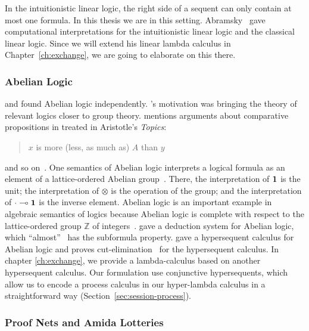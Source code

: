  In the intuitionistic linear logic, the right side of a sequent can only
 contain at most one formula.  In this thesis we are in this
 setting.
 Abramsky~\citep{abramsky1993computational} gave computational
 interpretations for the intuitionistic linear logic and the classical
 linear logic.  Since we will extend his linear lambda calculus in
 Chapter~\ref{ch:exchange}, we are going to elaborate on this there.

 \subsubsection{Abelian Logic}

 \citet{meyer-slaney-1989} and \citet{casari1989} found Abelian logic
 independently.  \citet{meyer-slaney-1989}'s motivation was bringing the
 theory of relevant logics closer to group theory.
 \citet{casari1989} mentions arguments about comparative propositions in
 treated in Aristotle's \textit{Topics}:
  \begin{quote}
   $x$ is more (less, as much as) $A$ than $y$
  \end{quote}
 and so on~\citep[p.~161]{casari1989}.
 One semantics of Abelian logic interprets a logical formula as an
 element of a lattice-ordered Abelian group~\citep[3.4.2.]{residuated}.  There,
 the interpretation of $\mathbf{1}$ is the unit;
 the interpretation of $\otimes$ is the operation of the group; and
 the interpretation of $\cdot\multimap\mathbf{1}$ is the inverse element.
 Abelian logic is an important example in algebraic semantics of logics
 because Abelian logic is complete with respect to the lattice-ordered
 group $\mathbb Z$ of integers~\citep[pp.~107--108]{residuated}.
 \citet{metcalfe2002} gave a deduction system for Abelian logic,
 which ``almost''~\citep[after Def.~8]{metcalfe2002} has the subformula property.
 \citet{metcalfe2006} gave a hypersequent calculus for Abelian logic and
 proves cut-elimination~\citep[Thm.~5]{metcalfe2006} for the
 hypersequent calculus.
 In chapter \ref{ch:exchange}, we provide a lambda-calculus based on
 another hypersequent calculus.  Our formulation use conjunctive
 hypersequents, which allow us to encode a process calculus in our
 hyper-lambda calculus in a straightforward way
 (Section~\ref{sec:session-process}).

 \subsubsection{Proof Nets and Amida Lotteries}
 \label{amidalot}

